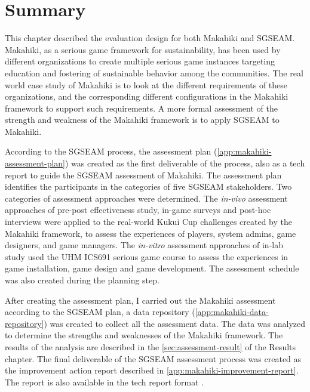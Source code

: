 \section{Summary}

This chapter described the evaluation design for both Makahiki and SGSEAM.  Makahiki, as a serious game framework for sustainability, has been used by different organizations to create multiple serious game instances targeting education and fostering of sustainable behavior among the communities. The real world case study of Makahiki is to look at the different requirements of these organizations, and the corresponding different configurations in the Makahiki framework to support such requirements. A more formal assessment of the strength and weakness of the Makahiki framework is to apply SGSEAM to Makahiki.

According to the SGSEAM process, the assessment plan (\autoref{app:makahiki-assessment-plan}) was created as the first deliverable of the process, also as a tech report \cite{csdl2-13-11} to guide the SGSEAM assessment of Makahiki. The assessment plan identifies the participants in the categories of five SGSEAM stakeholders. Two categories of assessment approaches were determined. The {\em in-vivo} assessment approaches of pre-post effectiveness study, in-game surveys and post-hoc interviews were applied to the real-world Kukui Cup challenges created by the Makahiki framework, to assess the experiences of players, system admins, game designers, and game managers. The {\em in-vitro} assessment approaches of in-lab study used the UHM ICS691 serious game course to assess the experiences in game installation, game design and game development. The assessment schedule was also created during the planning step.

After creating the assessment plan, I carried out the Makahiki assessment according to the SGSEAM plan, a data repository (\autoref{app:makahiki-data-repository}) was created to collect all the assessment data. The data was analyzed to determine the strengths and weaknesses of the Makahiki framework. The results of the analysis are described in the \autoref{sec:assessment-result} of the Results chapter. The final deliverable of the SGSEAM assessment process was created as the improvement action report described in \autoref{app:makahiki-improvement-report}. The report is also available in the tech report format \cite{csdl2-14-12}.

